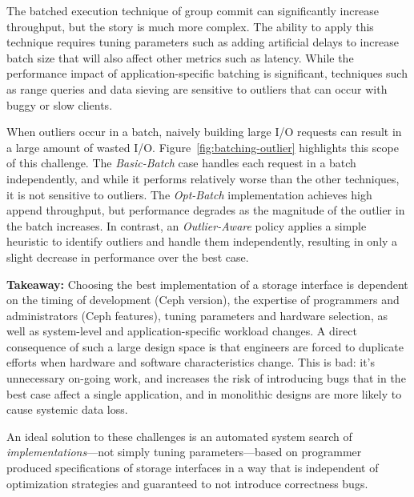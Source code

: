 The batched execution technique of group commit can significantly increase
throughput, but the story is much more complex. The ability to apply this
technique requires tuning parameters such as adding artificial delays to
increase batch size that will also affect other metrics such as latency.
While the performance impact of application-specific batching is significant,
techniques such as range queries and data sieving are sensitive to outliers
that can occur with buggy or slow clients.

When outliers occur in a batch, naively building large I/O requests can result
in a large amount of wasted I/O.  Figure~\ref{fig:batching-outlier} highlights
this scope of this challenge. The \emph{Basic-Batch} case handles each request
in a batch independently, and while it performs relatively worse than the
other techniques, it is not sensitive to outliers. The \emph{Opt-Batch}
implementation achieves high append throughput, but performance degrades as
the magnitude of the outlier in the batch increases. In contrast, an
\emph{Outlier-Aware} policy applies a simple heuristic to identify outliers
and handle them independently, resulting in only a slight decrease in
performance over the best case.

\textbf{Takeaway:} Choosing the best implementation of a storage interface is
dependent on the timing of development (Ceph version), the expertise of
programmers and administrators (Ceph features), tuning parameters and hardware
selection, as well as system-level and application-specific workload changes.
A direct consequence of such a large design space is that engineers are forced
to duplicate efforts when hardware and software characteristics change. This
is bad: it's unnecessary on-going work, and increases the risk of introducing
bugs that in the best case affect a single application, and in monolithic
designs are more likely to cause systemic data loss.

An ideal solution to these challenges is an automated system search of
\emph{implementations}---not simply tuning parameters---based on programmer
produced specifications of storage interfaces in a way that is independent of
optimization strategies and guaranteed to not introduce correctness bugs.
